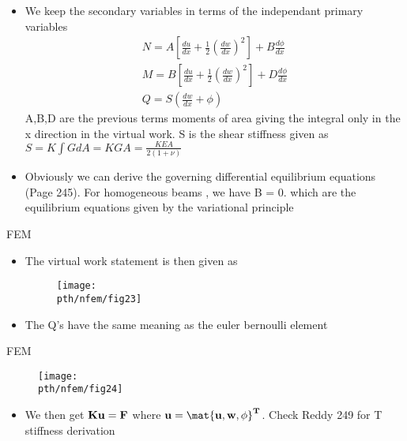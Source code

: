 	\begin{frame}
		\begin{itemize}
			\item We keep the secondary variables in terms of the independant primary variables
			\begin{equation}
			\begin{aligned}
				N = A \left[ \frac{du}{dx} + \frac{1}{2} \left(\frac{dw}{dx} \right)^2\right] + B \frac{d\phi}{dx} \\
				M = B \left[ \frac{du}{dx} + \frac{1}{2} \left(\frac{dw}{dx} \right)^2\right] + D \frac{d\phi}{dx} \\
				Q = S \left(\frac{dw}{dx} + \phi \right)
			\end{aligned}
			\end{equation}
			 A,B,D are the previous terms moments of area giving the integral only in the x direction in the virtual work. S is the shear stiffness given as $S = K \int G dA = K G A =  \frac{KEA}{2(1+ \nu)}$
			 \item  Obviously we can derive the governing differential equilibrium equations (Page 245). For homogeneous beams , we have B = 0. which are the equilibrium equations given by the variational principle
		\end{itemize}
	\end{frame}


	\begin{frame}{FEM}
		\begin{itemize}
			\item The virtual work statement is then given as 
			\begin{figure}
				\centering
				\texttt{[image: \\pth/nfem/fig23]} 		
			\end{figure}
			\item  The Q's have the same meaning as the euler bernoulli element
		\end{itemize}
	\end{frame}


	\begin{frame}{FEM}
		\begin{figure}
			\centering
			\texttt{[image: \\pth/nfem/fig24]} 		
		\end{figure}
		\begin{itemize}
			\item We then get $\mathbf{Ku = F}$ where $\ve{u = \mat{u,w,\phi}^T}$. Check Reddy 249 for T stiffness derivation
			
		\end{itemize}
	\end{frame}


